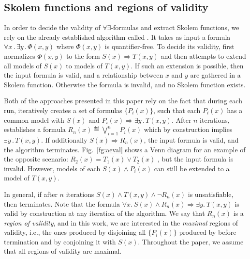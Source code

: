 \subsection{Skolem functions and regions of validity}
\label{sec:aeval}

In order to decide the validity of $\forall\exists$-formulas and extract Skolem functions, we rely on the already established algorithm  called \aeval. It takes as input a formula $\forall x \,.\, \exists y  \,.\, \Phi (x, y)$ where $\Phi (x, y)$ is quantifier-free. To decide its validity, \aeval first normalizes $\Phi (x, y)$ to the form $S(x) \Rightarrow T(x, y)$ and then attempts to extend all models of $S(x)$ to models of $T(x,y)$. If such an extension is possible, then the input formula is valid, and a relationship between $x$ and $y$ are gathered in a Skolem function.
Otherwise the formula is invalid, and no Skolem function exists.

Both of the approaches presented in this paper rely on the fact that during each run, \aeval iteratively creates a set of formulas $\{P_i(x)\}$, such that each $P_i(x)$ has a common model with $S(x)$ and $P_i(x) \Rightarrow \exists y \,.\,T (x,y)$.
After $n$ iterations, \aeval establishes a formula $R_n(x) \eqdef \bigvee_{i=1}^n P_i(x)$ which by construction implies $\exists y\,.\,T(x,y)$.
If additionally $S(x)\Rightarrow R_n(x)$, the input formula is valid, and the algorithm terminates.
%
Fig.~\ref{fg:aeval} shows a Venn diagram for an example of the opposite scenario: $R_2(x) = T_1(x) \lor T_2(x)$ , but the input formula is invalid.
However, models of each $S(x) \land P_i(x)$ can still be extended to a model of $T(x, y)$.

In general, if after $n$ iterations $S(x) \land T(x,y) \land \neg R_n(x)$ is unsatisfiable,
then \aeval terminates.
Note that the formula $\forall x.~ S(x) \land R_n(x) \Rightarrow \exists y .~T(x,y)$ is valid by construction at any iteration of the algorithm.
%
We say that $R_n(x)$ is a \emph{region of validity}, and in this work, we are interested in the \emph{maximal} regions of validity, i.e., the ones produced by disjoining all $\{P_i(x)\}$ produced by \aeval before termination and by conjoining it with $S(x)$.
Throughout the paper, we assume that all regions of validity are maximal.

